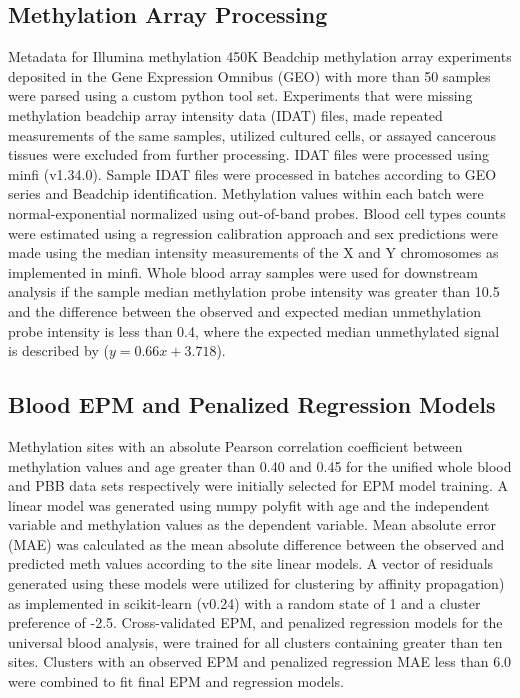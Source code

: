 \documentclass{article}
\begin{document}
{\begin{linenumbers}
\subsection{ Methylation Array Processing}

Metadata for Illumina methylation 450K Beadchip methylation array experiments deposited in the Gene Expression 
Omnibus (GEO) \cite{Barrett2012-gu} with more than 50 samples were parsed using a custom python tool set. Experiments 
that were missing methylation beadchip array intensity data (IDAT) files, made repeated measurements of the same 
samples, utilized cultured cells, or assayed cancerous tissues were excluded from further processing. IDAT files 
were processed using minfi\cite{Aryee2014-ky} (v1.34.0). Sample IDAT files were processed in batches according to 
GEO series and Beadchip  identification. Methylation values within each batch were normal-exponential normalized 
using out-of-band probes\cite{Triche2013-pp}. Blood cell types counts were estimated using a regression calibration 
approach\cite{Houseman2012-rr} and sex predictions were made using the median intensity measurements of the X and Y 
chromosomes as implemented in minfi\cite{Aryee2014-ky}. Whole blood array samples were used for downstream analysis 
if the sample median methylation probe intensity was greater than 10.5 and the difference between the observed and 
expected median unmethylation probe intensity is less than 0.4, where the expected median unmethylated signal is 
described by ($y=0.66x + 3.718$). 

\subsection{Blood EPM and Penalized Regression Models}

Methylation sites with an absolute Pearson correlation coefficient between methylation values and age greater than 
0.40 and 0.45 for the unified whole blood and PBB data sets respectively were initially selected for EPM model 
training. A linear model was generated using numpy polyfit \cite{Harris2020-yb} with age and the independent 
variable and methylation values as the dependent variable. Mean absolute error (MAE) was calculated as the mean 
absolute difference between the observed and predicted meth values according to the site linear models. A vector 
of residuals generated using these models were utilized for clustering by affinity propagation\cite{Frey2007-mu}) 
as implemented in scikit-learn (v0.24)\cite{Pedregosa2011-fi} with a random state of 1 and a cluster preference of 
-2.5. Cross-validated EPM, and penalized regression models for the universal blood analysis,  were trained for all 
clusters containing greater than ten sites. Clusters with an observed EPM and penalized regression MAE less than 6.0 
were combined to fit final EPM and regression models. 


\end{linenumbers}}
\end{document}
